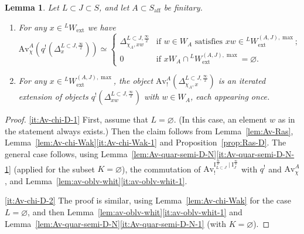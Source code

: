 \documentclass[11pt]{amsart}
\numberwithin{equation}{section}
\theoremstyle{plain}
\newtheorem{lem}[thm]{Lemma}
\theoremstyle{definition}
\newcommand{\I}{{\mathrm I}}
\newcommand{\semi}{{{\frac{\infty}{2}}}}
\newcommand{\quar}{{{\frac{\infty}{4}}}}
\newcommand{\Av}{\mathrm{Av}}
\newcommand{\ex}{\mathrm{ext}}
\newcommand{\af}{\mathrm{aff}}
\begin{document}
\begin{lem}
\label{lem:Av-chi-D}
Let $L \subset J \subset S$, and let $A \subset S_\af$ be finitary.

\begin{enumerate}
\item
\label{it:Av-chi-D-1}
For any $x\in {}^L W_\ex$ we have 
\[
\Av^{A}_{\chi}(q^! (\Delta^{L \subset J, \semi}_{x})) \simeq 
\begin{cases}
\Delta^{L \subset J,\semi}_{\chi_A, xw} & \text{if $w\in W_A$ satisfies $xw\in {}^L W_\ex^{(A,J),\max}$;} \\
0 & \text{if $x W_A \cap {}^L W_\ex^{(A,J),\max} = \varnothing$.} 
\end{cases}  
\]
\item 
\label{it:Av-chi-D-2}
For any $x\in {}^L W_\ex^{(A,J),\max}$, the object $\Av^{A}_{!}(\Delta^{L \subset J,\semi}_{\chi_A,x})$
is an iterated extension of objects $q^! (\Delta^{L \subset J, \semi}_{xw})$ with $w\in W_A$, 
each appearing once.
\end{enumerate}
\end{lem}

\begin{proof}
\eqref{it:Av-chi-D-1}
First, assume that $L=\varnothing$. (In this case, an element $w$ as in the statement always exists.) Then the claim follows from
Lemma~\ref{lem:Av-Ras}, Lemma~\ref{lem:Av-chi-Wak}\eqref{it:Av-chi-Wak-1} and Proposition~\ref{prop:Ras-D}. The general case follows, using Lemma~\ref{lem:Av-quar-semi-D-N}\eqref{it:Av-quar-semi-D-N-1} (applied for the subset $K=\varnothing$), the commutation of $\Av_!^{\I_{L \subset J}^\semi \mid \I_J^\quar}$ with $q^!$ and $\Av^{A}_{\chi}$, and Lemma~\ref{lem:av-oblv-whit}\eqref{it:av-oblv-whit-1}.

\eqref{it:Av-chi-D-2}
The proof is similar, using Lemma~\ref{lem:Av-chi-Wak} for the case $L=\varnothing$, and then Lem\-ma~\ref{lem:av-oblv-whit}\eqref{it:av-oblv-whit-1} and Lemma~\ref{lem:Av-quar-semi-D-N}\eqref{it:Av-quar-semi-D-N-1} (with $K = \varnothing$).
\end{proof}
\end{document}
